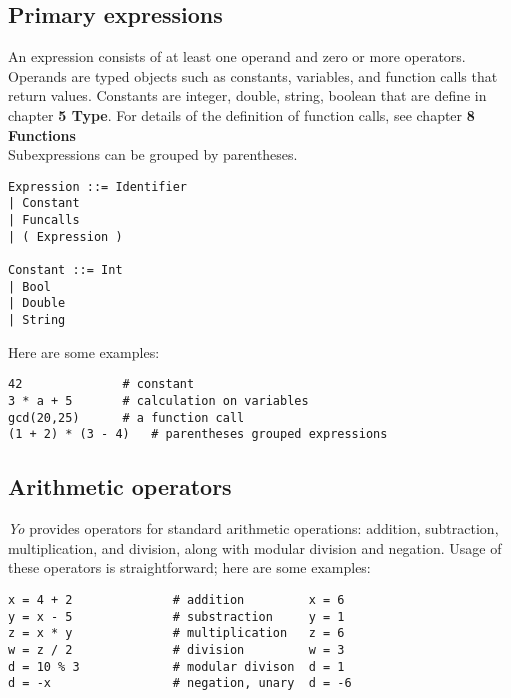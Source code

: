 \documentclass[12pt]{article}
\begin{document}
\subsection{Primary expressions} %
An expression consists of at least one operand and zero or more operators. Operands are typed objects such as constants, variables, and function calls that return values. Constants are integer, double, string, boolean that are define in chapter \textbf{5 Type}. For details of the definition of function calls, see chapter \textbf{8 Functions}\\
Subexpressions can be grouped by parentheses.\\
\begin{mdframed}[backgroundcolor=lightgray,hidealllines=true]
\begin{verbatim}
Expression ::= Identifier
| Constant
| Funcalls
| ( Expression )

Constant ::= Int
| Bool
| Double
| String
\end{verbatim}
\end{mdframed}
Here are some examples:
\begin{mdframed}[backgroundcolor=lightgray,hidealllines=true]
\begin{verbatim}
42              # constant
3 * a + 5       # calculation on variables
gcd(20,25)      # a function call
(1 + 2) * (3 - 4)   # parentheses grouped expressions
\end{verbatim}
\end{mdframed}
\subsection{Arithmetic operators} %
\textit{Yo} provides operators for standard arithmetic operations: addition, subtraction, multiplication, and division, along with modular division and negation. Usage of these operators is straightforward; here are some examples:
\begin{mdframed}[backgroundcolor=lightgray,hidealllines=true]
\begin{verbatim}
x = 4 + 2              # addition         x = 6
y = x - 5              # substraction     y = 1
z = x * y              # multiplication   z = 6
w = z / 2              # division         w = 3
d = 10 % 3             # modular divison  d = 1
d = -x                 # negation, unary  d = -6
\end{verbatim}
\end{mdframed}
\end{document}
